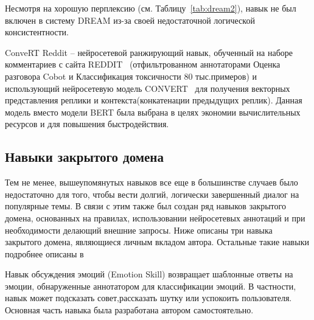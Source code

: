 Несмотря на хорошую перплексию (см. Таблицу~\ref{tab:dream2}), навык не был включен в систему {DREAM} из-за своей недостаточной логической консистентности.

\begin{table}[htbp]
\centering
\caption {Точность (перплексия) для генеративного навыка.}
\label{tab:dream2}%
\end{table}



ConveRT Reddit -- нейросетевой ранжирующий навык, обученный на наборе комментариев с сайта REDDIT~\cite{na_website_ndu} (отфильтрованном аннотаторами Оценка разговора Cobot и Классификация токсичности 80 тыс.примеров) и использующий нейросетевую модель CONVERT~\cite{henderson_2019} для получения векторных представления реплики и контекста(конкатенации предыдущих реплик). Данная модель вместо модели BERT была выбрана в целях экономии вычислительных ресурсов и для повышения быстродействия.

\subsection{Навыки закрытого домена}\label{dream:1:closed}

Тем не менее, вышеупомянутых навыков все еще в большинстве случаев было недостаточно для того, чтобы вести долгий, логически завершенный диалог на популярные темы. В связи с этим также был создан ряд навыков закрытого домена, основанных на правилах, использовании нейросетевых аннотаций и при необходимости делающий внешние запросы. Ниже описаны три навыка закрытого домена, являющиеся личным вкладом автора. Остальные такие навыки подробнее описаны в~\cite{dream1,dream1_trudy}

Навык обсуждения эмоций (Emotion Skill) возвращает шаблонные ответы на эмоции, обнаруженные аннотатором для классификации эмоций. В частности, навык может подсказать совет,рассказать шутку или успокоить пользователя. Основная часть навыка была разработана автором самостоятельно.

